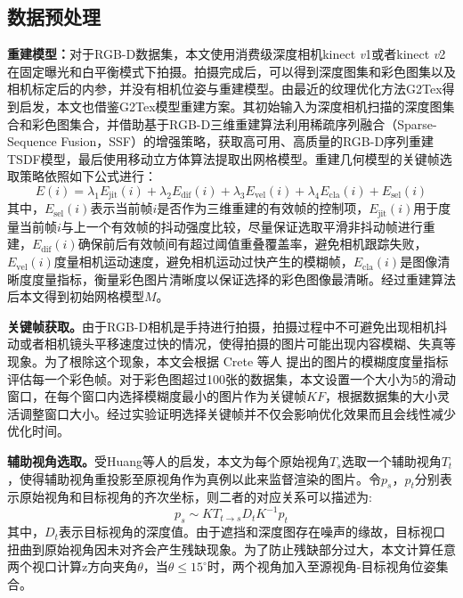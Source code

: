 \subsection{数据预处理}
\noindent\textbf{重建模型：}对于RGB-D数据集，本文使用消费级深度相机kinect \emph{v}1或者kinect \emph{v}2在固定曝光和白平衡模式下拍摄。拍摄完成后，可以得到深度图集和彩色图集以及相机标定后的内参，并没有相机位姿与重建模型。由最近的纹理优化方法G2Tex得到启发，本文也借鉴G2Tex模型重建方案。其初始输入为深度相机扫描的深度图集合和彩色图集合，并借助基于RGB-D三维重建算法利用稀疏序列融合（Sparse-Sequence Fusion，SSF）的增强策略，获取高可用、高质量的RGB-D序列重建TSDF模型，最后使用移动立方体算法提取出网格模型。重建几何模型的关键帧选取策略依照如下公式进行：
\begin{equation}
E(i)= \lambda_{1} E_{\mathrm{jit}}(i)+\lambda_{2} E_{\mathrm{dif}}(i)+\lambda_{3} E_{\mathrm{vel}}(i)+\lambda_{4}E_{\mathrm{cla}}(i)+E_{\mathrm{sel}}(i)
\end{equation}
其中，$E_{\mathrm{sel}}(i)$表示当前帧$i$是否作为三维重建的有效帧的控制项，$E_{\mathrm{jit}}(i)$用于度量当前帧$i$与上一个有效帧的抖动强度比较，尽量保证选取平滑非抖动帧进行重建，$E_{\mathrm{dif}}(i)$确保前后有效帧间有超过阈值重叠覆盖率，避免相机跟踪失败，$E_{\mathrm{vel}}(i)$度量相机运动速度，避免相机运动过快产生的模糊帧，$E_{\mathrm{cla}}(i)$是图像清晰度度量指标，衡量彩色图片清晰度以保证选择的彩色图像最清晰。经过重建算法后本文得到初始网格模型$M$。\par
\noindent\textbf{关键帧获取。}由于RGB-D相机是手持进行拍摄，拍摄过程中不可避免出现相机抖动或者相机镜头平移速度过快的情况，使得拍摄的图片可能出现内容模糊、失真等现象。为了根除这个现象，本文会根据 Crete 等人 提出的图片的模糊度度量指标评估每一个彩色帧。对于彩色图超过100张的数据集，本文设置一个大小为5的滑动窗口，在每个窗口内选择模糊度最小的图片作为关键帧$KF$，根据数据集的大小灵活调整窗口大小。经过实验证明选择关键帧并不仅会影响优化效果而且会线性减少优化时间。 \par
\noindent\textbf{辅助视角选取。}受Huang等人的启发，本文为每个原始视角$T_s$选取一个辅助视角$T_t$，使得辅助视角重投影至原视角作为真例以此来监督渲染的图片。令$p_s$，$p_t$分别表示原始视角和目标视角的齐次坐标，则二者的对应关系可以描述为:
\begin{equation}
	p_s\sim KT_{t\rightarrow s}D_tK^{-1}p_t \label{work1:wrap}
\end{equation}
其中，$D_t$表示目标视角的深度值。由于遮挡和深度图存在噪声的缘故，目标视口扭曲到原始视角因未对齐会产生残缺现象。为了防止残缺部分过大，本文计算任意两个视口计算z方向夹角$\theta$，当$\theta\le15^{\circ}$时，两个视角加入至源视角-目标视角位姿集合。

